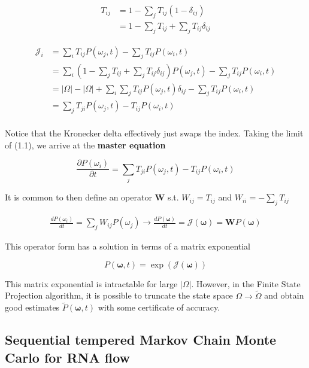 \documentclass{ucetd}
\begin{document}
\begin{align*}
T_{ij} &= 1 - \sum_{j}T_{ij}(1-\delta_{ij})\\
&= 1 - \sum_{j}T_{ij} + \sum_{j}T_{ij}\delta_{ij}
\end{align*}


\begin{align*}
\mathcal{J}_{i} &= \sum_{i}T_{ij}P(\omega_{j},t) - \sum_{j}T_{ij}P(\omega_{i},t)\\
&= \sum_{i}\left(1 - \sum_{j}T_{ij} + \sum_{j}T_{ij}\delta_{ij}\right)P(\omega_{j},t) - \sum_{j}T_{ij}P(\omega_{i},t)\\
&= |\Omega| - |\Omega| + \sum_{i}\sum_{j}T_{ij}P(\omega_{j},t)\delta_{ij} - \sum_{j}T_{ij}P(\omega_{i},t)\\
&= \sum_{j}T_{ji}P(\omega_{j},t) - T_{ij}P(\omega_{i},t)\\
\end{align*}

Notice that the Kronecker delta effectively just swaps the index. Taking the limit of (1.1), we arrive at the \textbf{master equation}


\begin{equation*}
\frac{\partial P(\omega_{i})}{\partial t} = \sum_{j}T_{ji}P(\omega_{j},t) - T_{ij}P(\omega_{i},t)
\end{equation*}

It is common to then define an operator $\bm{W}$ s.t. $W_{ij} = T_{ij}$ and $W_{ii} = -\sum_{j}T_{ij}$ 

\begin{align*}
\frac{dP(\omega_{i})}{dt} = \sum_{j}W_{ij}P(\omega_{j}) \rightarrow \frac{dP(\bm{\omega})}{dt} = \mathcal{J}(\bm{\omega}) = \mathbf{W}P(\bm{\omega})
\end{align*}

This operator form has a solution in terms of a matrix exponential

\begin{equation*}
P(\bm{\omega}, t) = \exp(\mathcal{J}(\bm{\omega}))
\end{equation*}

This matrix exponential is intractable for large $|\Omega|$. However, in the Finite State Projection algorithm, it is possible to truncate the state space $\Omega \rightarrow \tilde{\Omega}$ and obtain good estimates $\tilde{P}(\bm{\omega}, t)$ with some certificate of accuracy.

\subsection{Sequential tempered Markov Chain Monte Carlo for RNA flow}
\end{document}
